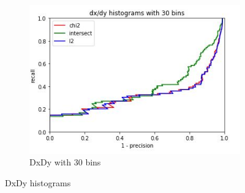 \documentclass[
	12pt, %
]{fphw}
\begin{document}
\begin{figure}[h!]
\begin{subfigure}[b]{0.3\textwidth}
         \includegraphics[width=\textwidth]{img/plots/dxdy_30.JPG}
         \caption{DxDy with 30 bins}
         \label{fig:five over x}
     \end{subfigure}
        \caption{DxDy histograms}
        \label{fig:three graphs}
\end{figure} \\







\end{document}
